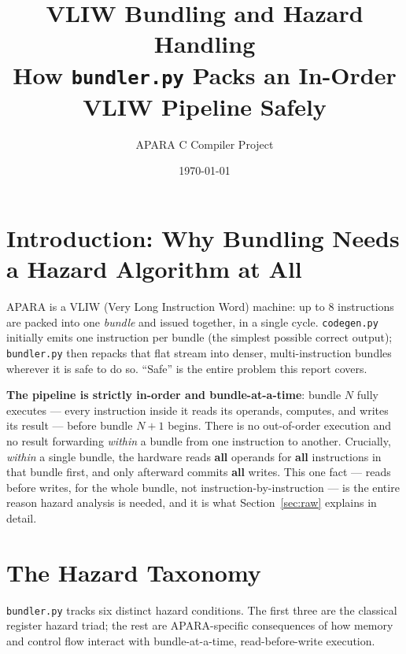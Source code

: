 \documentclass[11pt,a4paper]{article}
\title{\textbf{VLIW Bundling and Hazard Handling}\\[2mm]
\large How \texttt{bundler.py} Packs an In-Order VLIW Pipeline Safely}
\author{APARA C Compiler Project}
\date{\today}
\begin{document}
\maketitle
\thispagestyle{fancy}
\vspace{-8mm}

\section{Introduction: Why Bundling Needs a Hazard Algorithm at All}

APARA is a VLIW (Very Long Instruction Word) machine: up to 8 instructions are packed
into one \emph{bundle} and issued together, in a single cycle. \texttt{codegen.py}
initially emits one instruction per bundle (the simplest possible correct output);
\texttt{bundler.py} then repacks that flat stream into denser, multi-instruction bundles
wherever it is safe to do so. ``Safe'' is the entire problem this report covers.

\textbf{The pipeline is strictly in-order and bundle-at-a-time}: bundle $N$ fully executes
--- every instruction inside it reads its operands, computes, and writes its result ---
before bundle $N+1$ begins. There is no out-of-order execution and no result forwarding
\emph{within} a bundle from one instruction to another. Crucially, \emph{within} a single
bundle, the hardware reads \textbf{all} operands for \textbf{all} instructions in that
bundle first, and only afterward commits \textbf{all} writes. This one fact --- reads
before writes, for the whole bundle, not instruction-by-instruction --- is the entire
reason hazard analysis is needed, and it is what Section~\ref{sec:raw} explains in detail.

\section{The Hazard Taxonomy}
\label{sec:hazards}

\texttt{bundler.py} tracks six distinct hazard conditions. The first three are the
classical register hazard triad; the rest are APARA-specific consequences of how memory
and control flow interact with bundle-at-a-time, read-before-write execution.
\end{document}
